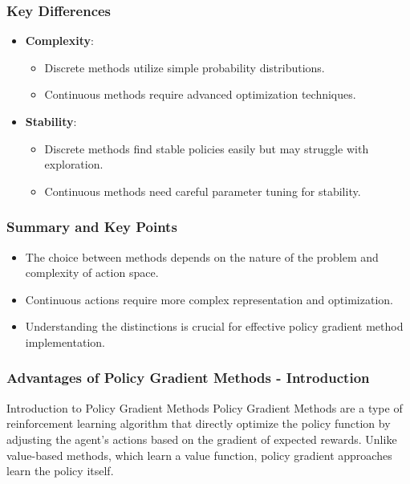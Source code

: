 \documentclass[aspectratio=169]{beamer}
\begin{document}
\begin{frame}[fragile]
    \frametitle{Key Differences}
    \begin{itemize}
        \item \textbf{Complexity}:
        \begin{itemize}
            \item Discrete methods utilize simple probability distributions.
            \item Continuous methods require advanced optimization techniques.
        \end{itemize}
        \item \textbf{Stability}:
        \begin{itemize}
            \item Discrete methods find stable policies easily but may struggle with exploration.
            \item Continuous methods need careful parameter tuning for stability.
        \end{itemize}
    \end{itemize}
\end{frame}

\begin{frame}[fragile]
    \frametitle{Summary and Key Points}
    \begin{itemize}
        \item The choice between methods depends on the nature of the problem and complexity of action space.
        \item Continuous actions require more complex representation and optimization.
        \item Understanding the distinctions is crucial for effective policy gradient method implementation.
    \end{itemize}
\end{frame}

\begin{frame}[fragile]
    \frametitle{Advantages of Policy Gradient Methods - Introduction}
    \begin{block}{Introduction to Policy Gradient Methods}
        Policy Gradient Methods are a type of reinforcement learning algorithm that directly optimize the policy function by adjusting the agent's actions based on the gradient of expected rewards. Unlike value-based methods, which learn a value function, policy gradient approaches learn the policy itself.
    \end{block}
\end{frame}
\end{document}
